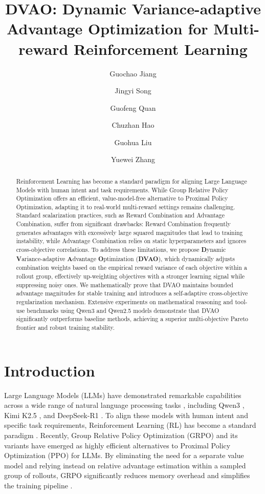 \documentclass{llmxive}
\title{DVAO: Dynamic Variance-adaptive Advantage Optimization for Multi-reward Reinforcement Learning}
\author{Guochao Jiang \and Jingyi Song \and Guofeng Quan \and Chuzhan Hao \and Guohua Liu \and Yuewei Zhang}
\begin{document}
\maketitle
\begin{abstract}
Reinforcement Learning has become a standard paradigm for aligning Large Language Models with human intent and task requirements. While Group Relative Policy Optimization offers an efficient, value-model-free alternative to Proximal Policy Optimization, adapting it to real-world multi-reward settings remains challenging. Standard scalarization practices, such as Reward Combination and Advantage Combination, suffer from significant drawbacks: Reward Combination frequently generates advantages with excessively large squared magnitudes that lead to training instability, while Advantage Combination relies on static hyperparameters and ignores cross-objective correlations. To address these limitations, we propose \textbf{D}ynamic \textbf{V}ariance-adaptive \textbf{A}dvantage \textbf{O}ptimization (\textbf{DVAO}), which dynamically adjusts combination weights based on the empirical reward variance of each objective within a rollout group, effectively up-weighting objectives with a stronger learning signal while suppressing noisy ones. We mathematically prove that DVAO maintains bounded advantage magnitudes for stable training and introduces a self-adaptive cross-objective regularization mechanism. Extensive experiments on mathematical reasoning and tool-use benchmarks using Qwen3 and Qwen2.5 models demonstrate that DVAO significantly outperforms baseline methods, achieving a superior multi-objective Pareto frontier and robust training stability.
\end{abstract}
\section{Introduction}
Large Language Models (LLMs) have demonstrated remarkable capabilities across a wide range of natural language processing tasks \citep{llm-survey}, including Qwen3 \citep{qwen3}, Kimi K2.5 \citep{k2.5}, and DeepSeek-R1 \citep{deepseek-r1}. To align these models with human intent and specific task requirements, Reinforcement Learning (RL) has become a standard paradigm \citep{rl-survey, sft-rl}. Recently, Group Relative Policy Optimization (GRPO) \citep{grpo} and its variants \citep{dapo, gspo, vcrl} have emerged as highly efficient alternatives to Proximal Policy Optimization (PPO) \citep{ppo} for LLMs. By eliminating the need for a separate value model and relying instead on relative advantage estimation within a sampled group of rollouts, GRPO significantly reduces memory overhead and simplifies the training pipeline \citep{liu2025part}.
\end{document}
